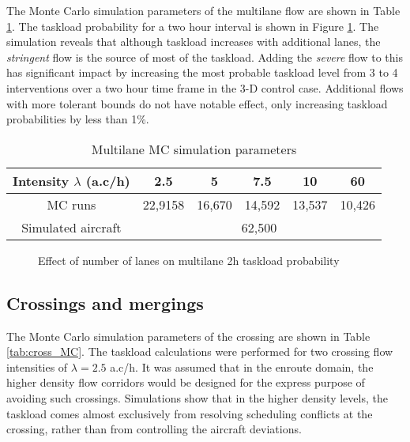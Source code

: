 \documentclass[conference]{IEEEtran}
\begin{document}
The Monte Carlo simulation parameters of the multilane flow are shown in Table \ref{tab:multiflow_MC}. The taskload probability for a two hour interval is shown in Figure \ref{fig:task_lat_multifl}. The simulation reveals that although taskload increases with additional lanes, the \emph{stringent} flow is the source of most of the taskload. Adding the \emph{severe} flow to this has significant impact by increasing the most probable taskload level from 3 to 4 interventions over a two hour time frame in the 3-D control case. Additional flows with more tolerant bounds do not have notable effect, only increasing taskload probabilities by less than 1\%.

\begin{table}
\caption{Multilane MC simulation parameters}
\label{tab:multiflow_MC}
\centering
\begin{tabular}{|c|c|c|c|c|c|}
\hline\hline
Intensity $\lambda$ (a.c/h)&  2.5 & 5 & 7.5 & 10 & 60 \bigstrut\\ \hline
MC runs& 22,9158 & 16,670 & 14,592 & 13,537 & 10,426 \bigstrut \\ \hline
Simulated aircraft & \multicolumn{5}{c|}{62,500} \bigstrut\\ \hline\hline
\end{tabular}
\end{table}



\begin{figure}[!h]
\centering
{}
\caption{Effect of number of lanes on multilane 2h taskload probability}
\label{fig:task_lat_multifl}
\end{figure}


\subsection{Crossings and mergings}
The Monte Carlo simulation parameters of the crossing are shown in Table \ref{tab:cross_MC}. The taskload calculations were performed for two crossing flow intensities of $\lambda=2.5$ a.c/h. It was assumed that in the enroute domain, the higher density flow corridors would be designed for the express purpose of avoiding such crossings. Simulations show that in the higher density levels, the taskload comes almost exclusively from resolving scheduling conflicts at the crossing, rather than from controlling the aircraft deviations.
\end{document}
